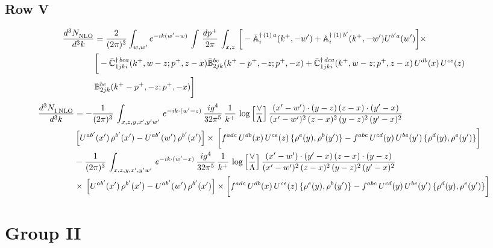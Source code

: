 \documentclass[9pt]{article}
\def\mf#1{\mathbb{#1}}
\numberwithin{equation}{section}
\begin{document}
\subsection{{\color{green}Row V}}
\begin{align}
    \frac{d^{3}N_{\rm NLO}^{\rm}}{d^{3}k}  & = \frac{2}{(2\pi)^{3}}  \int_{w, w^\prime} e^{-ik(w^\prime-w)}\, \int\, \frac{dp^{+}}{2\pi}\,\int_{x,z}\, \bigg[-\bar{\mf{A}}^{\dagger\,(1)\,a}_{i}(k^{+},-w^{\prime})+\mf{A}^{\dagger\, (1)\, b^{\prime}}_{i}(k^{+},-w^{\prime})U^{b^{\prime}a}(w^{\prime})\bigg]\times\notag \\ & \bigg[-\Bar{\mf{C}}^{\dagger\, bca}_{1jki}(k^{+},w-z;p^{+},z-x)\Bar{\mf{B}}^{bc}_{2jk}(k^{+}-p^{+},- z;p^{+},-x)+\bar{\mf{C}}^{\dagger\, dca}_{1jki}(k^+,w-z; p^+, z-x)\,U^{db}(x)\,U^{ce}(z) \notag \\ & {\mf{B}}^{be}_{2jk} (k^{+}-p^+, -z; p^+, -x) \bigg]\nonumber
\end{align}
\begin{align}
     \frac{d^{3}N_{1\,\rm NLO}^{\rm}}{d^{3}k}  & =  -\frac{1}{(2\pi)^{3}}\, \int_{x,z,y,x',y'w'}\,e^{-ik\cdot (w^\prime-z)}\,\frac{ig^{4}}{32\pi^{5}}\, \frac{1}{k^{+}}\,\log{\left[\frac{\vee}{\Lambda}\right]}\,\frac{(x'-w')\cdot (y-z)\,(z-x)\cdot (y'-x)}{(x'-w')^{2}\,(z-x)^{2}\,(y-z)^{2}\,(y'-x)^{2}}\,\notag \\ & \left[U^{ab'}(x')\,\rho^{b'}(x')-U^{ab'}(w')\,\rho^{b'}(x')\right]\times\, \bigg[f^{adc}\,U^{db}(x)\,U^{ce}(z)\, \{\rho^{e}(y),\rho^{b}(y')\}-f^{abc}\,U^{cd}(y)\,U^{be}(y')\, \{\rho^{d}(y),\rho^{e}(y')\}\bigg]\notag \\ &  -\frac{1}{(2\pi)^{3}}\, \int_{x,z,y,x',y'w'}\,e^{-ik\cdot (w^\prime-x)}\,\frac{ig^{4}}{32\pi^{5}}\, \frac{1}{k^{+}}\,\log{\left[\frac{\vee}{\Lambda}\right]} \,\frac{(x'-w')\cdot (y'-x)\,(z-x)\cdot (y-z)}{(x'-w')^{2}\,(z-x)^{2}\,(y-z)^{2}\,(y'-x)^{2}}\notag \\ & \times\, \left[U^{ab'}(x')\,\rho^{b'}(x')-U^{ab'}(w')\,\rho^{b'}(x')\right]\times \bigg[f^{adc}\,U^{db}(x)\,U^{ce}(z)\, \{\rho^{e}(y),\rho^{b}(y')\}-f^{abc}\,U^{cd}(y)\,U^{be}(y')\, \{\rho^{d}(y),\rho^{e}(y')\}\bigg]
\end{align}
\section{Group II}
\end{document}
